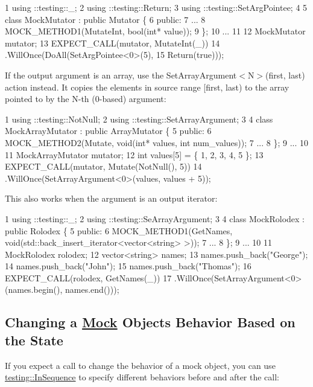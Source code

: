 \begin{DoxyCode}
1 using ::testing::\_;
2 using ::testing::Return;
3 using ::testing::SetArgPointee;
4 
5 class MockMutator : public Mutator \{
6  public:
7   ...
8   MOCK\_METHOD1(MutateInt, bool(int* value));
9 \};
10 ...
11 
12   MockMutator mutator;
13   EXPECT\_CALL(mutator, MutateInt(\_))
14       .WillOnce(DoAll(SetArgPointee<0>(5),
15                       Return(true)));
\end{DoxyCode}


If the output argument is an array, use the {\ttfamily Set\+Array\+Argument$<$N$>$(first, last)} action instead. It copies the elements in source range {\ttfamily \mbox{[}first, last)} to the array pointed to by the {\ttfamily N}-\/th (0-\/based) argument\+:


\begin{DoxyCode}
1 using ::testing::NotNull;
2 using ::testing::SetArrayArgument;
3 
4 class MockArrayMutator : public ArrayMutator \{
5  public:
6   MOCK\_METHOD2(Mutate, void(int* values, int num\_values));
7   ...
8 \};
9 ...
10 
11   MockArrayMutator mutator;
12   int values[5] = \{ 1, 2, 3, 4, 5 \};
13   EXPECT\_CALL(mutator, Mutate(NotNull(), 5))
14       .WillOnce(SetArrayArgument<0>(values, values + 5));
\end{DoxyCode}


This also works when the argument is an output iterator\+:


\begin{DoxyCode}
1 using ::testing::\_;
2 using ::testing::SeArrayArgument;
3 
4 class MockRolodex : public Rolodex \{
5  public:
6   MOCK\_METHOD1(GetNames, void(std::back\_insert\_iterator<vector<string> >));
7   ...
8 \};
9 ...
10 
11   MockRolodex rolodex;
12   vector<string> names;
13   names.push\_back("George");
14   names.push\_back("John");
15   names.push\_back("Thomas");
16   EXPECT\_CALL(rolodex, GetNames(\_))
17       .WillOnce(SetArrayArgument<0>(names.begin(), names.end()));
\end{DoxyCode}


\subsection*{Changing a \hyperlink{classMock}{Mock} Object\textquotesingle{}s Behavior Based on the State}

If you expect a call to change the behavior of a mock object, you can use {\ttfamily \hyperlink{classtesting_1_1InSequence}{testing\+::\+In\+Sequence}} to specify different behaviors before and after the call\+:



